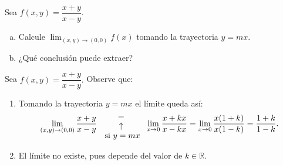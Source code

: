 \begin{prob}
Sea $f(x,y)=\dfrac{x+y}{x-y}.$
\begin{enumerate}[(a)]
    \item Calcule $\displaystyle\lim_{(x,y)\to (0,0)}f(x)$ tomando la trayectoria $y=mx.$
    \item ¿Qué conclusión puede extraer?
\end{enumerate}
\begin{myproof}
Sea $f(x,y)=\dfrac{x+y}{x-y}.$ Observe que:
\begin{enumerate}[$a)$]
\item Tomando la trayectoria $y=mx$ el límite queda así:
\begin{align*}
\displaystyle\lim_{(x,y)\to (0,0)} \dfrac{x+y}{x-y} {{=}\atop {\begin{array}{c}
\uparrow\\ \text{ si $y=mx$}\end{array}} } \displaystyle\lim_{x\to 0}\dfrac{x+kx}{x-kx}=\displaystyle\lim_{x\to 0}\dfrac{x(1+k)}{x(1-k)}=\dfrac{1+k}{1-k}.
\end{align*}
\item El límite no existe, pues depende del valor de $k\in \mathbb{R}$.
\end{enumerate}
\end{myproof}
\end{prob}

